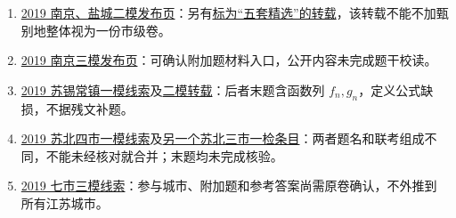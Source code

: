 \documentclass[UTF8,12pt,a4paper,fontset=fandol]{ctexart}
\begin{document}
\begin{enumerate}
\item \href{https://m.koolearn.com/gaokao/20190321/1211493.html}{2019 南京、盐城二模发布页}：另有\href{https://max.book118.com/html/2019/0419/8102132114002017.shtm}{标为“五套精选”的转载}，该转载不能不加甄别地整体视为一份市级卷。
\item \href{https://app.gaokaozhitongche.com/news/h/0O7gr6OA}{2019 南京三模发布页}：可确认附加题材料入口，公开内容未完成题干校读。
\item \href{https://m.koolearn.com/news/20190319/1170460.html}{2019 苏锡常镇一模线索}及\href{https://www.renrendoc.com/p-83313379.html}{二模转载}：后者末题含函数列 $f_n,g_n$，定义公式缺损，不据残文补题。
\item \href{https://max.book118.com/html/2019/0419/7121015136002021.shtm}{2019 苏北四市一模线索}及\href{https://max.book118.com/html/2023/1006/7140025105005164.shtm}{另一个苏北三市一检条目}：两者题名和联考组成不同，不能未经核对就合并；末题均未完成核验。
\item \href{https://max.book118.com/html/2019/0630/8101117122002032.shtm}{2019 七市三模线索}：参与城市、附加题和参考答案尚需原卷确认，不外推到所有江苏城市。
\end{enumerate}
\end{document}
